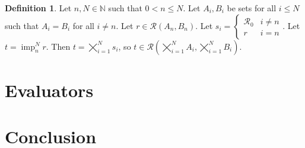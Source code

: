 \documentclass{article}
\theoremstyle{definition}
\newtheorem{definition}{Definition}[subsection]
\theoremstyle{plain}
\def\rule{\mathcal{R}}
\DeclareMathOperator{\imp}{imp}
\begin{document}
\begin{definition}
  Let $ n, N \in \mathbb{N} $ such that $ 0 < n \leq N $.
  Let $ A_i, B_i $ be sets for all $ i \leq N $
  such  that $ A_i = B_i $ for all $ i \neq n $.
  Let $ r \in \rule (A_n, B_n)$.
  Let $ s_i = \begin{cases} \rule_0 & i \neq n \\ r & i = n \end{cases} $.
  Let $ t = \imp_n^N r $.
  Then $ t = \bigtimes_{i=1}^N s_i $,
  so $ t \in \rule (\bigtimes_{i=1}^N A_i, \bigtimes_{i=1}^N B_i) $.
\end{definition}

\section{Evaluators}

\section{Conclusion}
\end{document}
